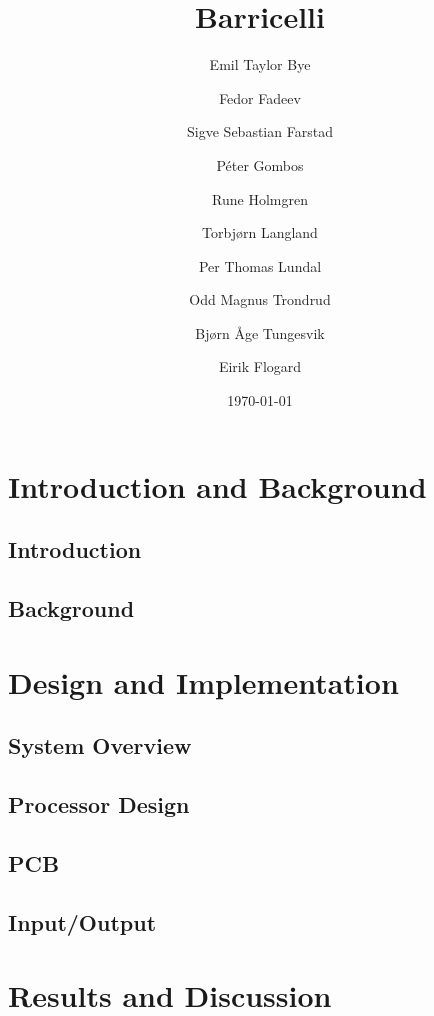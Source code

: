 \documentclass{report}
\title{Barricelli}
\date{\today}
\author{Emil Taylor Bye
     \and Fedor Fadeev
     \and Sigve Sebastian Farstad
     \and Péter Gombos
     \and Rune Holmgren
     \and Torbjørn Langland
     \and Per Thomas Lundal
     \and Odd Magnus Trondrud
     \and Bjørn Åge Tungesvik
     \and Eirik Flogard
}
\begin{document}


\maketitle

\begin{abstract}
	
\end{abstract}

\tableofcontents
\newpage
\setcounter{page}{1}

\part{Introduction and Background}

\chapter{Introduction}
	

\chapter{Background}
	

\part{Design and Implementation}

\chapter{System Overview}
    

\chapter{Processor Design}
	

\chapter{PCB}
	

\chapter{Input/Output}
	

\part{Results and Discussion}
\end{document}
